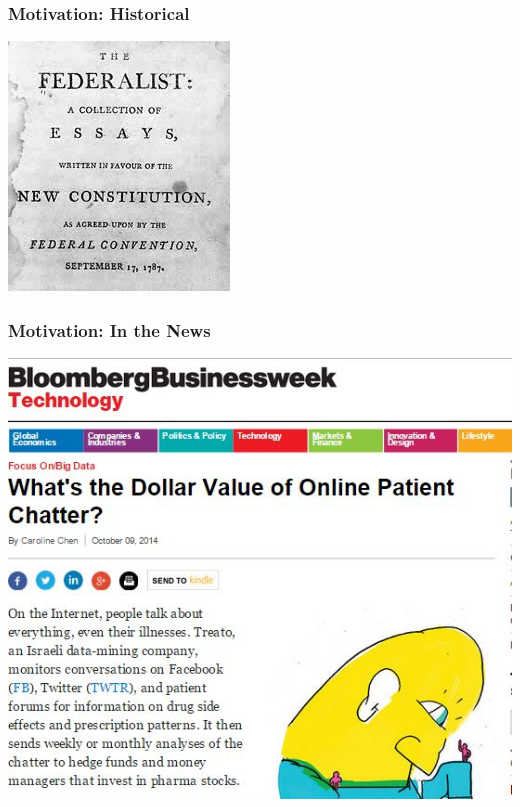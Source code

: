 \documentclass[presentation]{beamer}
\begin{document}
\begin{frame}
\frametitle{Motivation: Historical }
\pause
\begin{center}
\includegraphics[height=.8\textheight]{Images/federalist.jpg}
\end{center}
\end{frame}

\begin{frame}
\frametitle{Motivation: In the News}
\pause
\begin{center}
\includegraphics[height=.8\textheight]{Images/Treato.jpg}
\end{center}
\end{frame}
\end{document}
